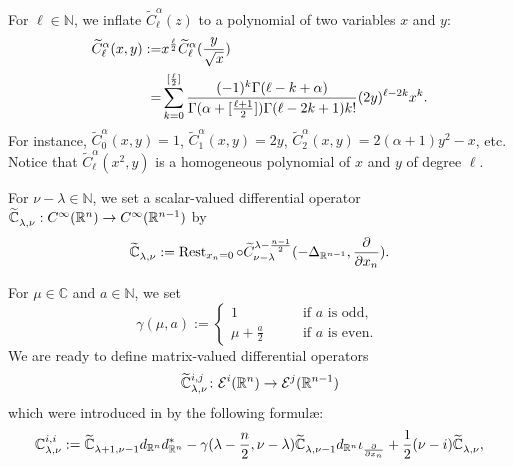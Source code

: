 For $\ell \in {\mathbb{N}}$, 
 we inflate $\widetilde C_{\ell}^{\alpha} (z)$
 to a polynomial of two variables
 $x$ and $y$:
\begin{align}
  \widetilde C_{\ell}^{\alpha} (x,y)
  :=& x^{\frac \ell 2} \widetilde C_{\ell}^{\alpha} (\frac{y}{\sqrt x})
\notag
\\
  =& \sum_{k=0}^{[\frac \ell 2]} 
     \frac{(-1)^k \Gamma(\ell-k+\alpha)}
          {\Gamma(\alpha + [\frac{\ell +1}{2}])\Gamma(\ell-2k+1)k!}(2y)^{\ell -2k}x^k.  
\label{eqn:Gegentwo}
\end{align}
For instance, 
 $\widetilde C_{0}^{\alpha} (x,y)=1$, 
 $\widetilde C_{1}^{\alpha} (x,y)=2y$, 
 $\widetilde C_{2}^{\alpha} (x,y)=2(\alpha+1)y^2-x$, etc.  
Notice that $\widetilde C_{\ell}^{\alpha} (x^2,y)$ is a homogeneous
 polynomial of $x$ and $y$ of degree $\ell$.  



For $\nu-\lambda \in {\mathbb{N}}$, 
we set
 a scalar-valued differential operator
 $\widetilde{{\mathbb{C}}}_{{\lambda},{\nu}}^{{}}:C^{\infty}({\mathbb{R}}^n)
 \to 
 C^{\infty}({\mathbb{R}}^{n-1})$
 by 
\begin{equation}
\label{eqn:Cln}
   \widetilde{{\mathbb{C}}}_{{\lambda},{\nu}}^{{}}
   :=
   \operatorname{Rest}_{x_n=0} \circ
   \widetilde C_{\nu-\lambda}^{\lambda -\frac{n-1}{2}}
   (-\Delta_{{\mathbb{R}}^{n-1}}, \frac{\partial}{\partial x_n}).  
\end{equation}



For $\mu \in {\mathbb{C}}$
 and $a \in {\mathbb{N}}$, 
 we set 
\begin{equation}
\label{eqn:gamma}
\gamma(\mu,a)
:=
\begin{cases}
1
&\text{if $a$ is odd, }
\\
\mu + \frac a 2
\qquad
&\text{if $a$ is even.  }
\end{cases}
\end{equation}
We are ready 
 to define matrix-valued differential operators
\[
   \widetilde{{\mathbb{C}}}_{{\lambda},{\nu}}^{{i,j}}\colon
 {\mathcal{E}}^i({\mathbb{R}}^n)
 \to 
 {\mathcal{E}}^j({\mathbb{R}}^{n-1})
\]
which were introduced in \cite[(2.24) and (2.26)]{KKP}
 by the following formul{\ae}:
\begin{equation}
\label{eqn:Ciiln}
{\mathbb{C}}_{{\lambda},{\nu}}^{{i, i}}
:=
\widetilde{{\mathbb{C}}}_{{\lambda+1},{\nu-1}}^{{}} d_{\mathbb{R}^n}d_{\mathbb{R}^n}^{\ast}
-
\gamma(\lambda - \frac n 2, \nu -\lambda) 
\widetilde{{\mathbb{C}}}_{{\lambda},{\nu-1}}^{{}} d_{\mathbb{R}^n} \iota_{\frac{\partial}{\partial x_n}}
+\frac 1 2(\nu-i)
\widetilde{{\mathbb{C}}}_{{\lambda},{\nu}}^{{}}, 
\end{equation}

